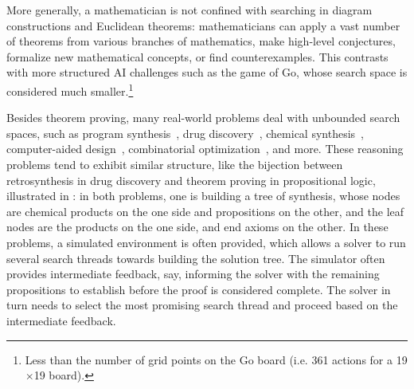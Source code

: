 More generally, a mathematician is not confined with searching in diagram constructions and Euclidean theorems: mathematicians can apply a vast number of theorems from various branches of mathematics, make high-level conjectures, formalize new mathematical concepts, or find counterexamples. This contrasts with more structured AI challenges such as the game of Go, whose search space is considered much smaller.\footnote{Less than the number of grid points on the Go board (i.e. 361 actions for a 19$\times$19 board).}

Besides theorem proving, many real-world problems deal with unbounded search spaces, such as program synthesis~\citep{DBLP:journals/ftpl/GulwaniPS17}, drug discovery~\citep{Drews2000DrugDA}, chemical synthesis~\citep{DBLP:journals/nature/SeglerPW18}, computer-aided design~\citep{computer_aided_design}, combinatorial optimization~\citep{DBLP:journals/eor/BengioLP21}, and more. These reasoning problems tend to exhibit similar structure, like the bijection between retrosynthesis in drug discovery and theorem proving in propositional logic, illustrated in : in both problems, one is building a tree of synthesis, whose nodes are chemical products on the one side and propositions on the other, and the leaf nodes are the products on the one side, and end axioms on the other. In these problems, a simulated environment is often provided, which allows a solver to run several search threads towards building the solution tree. The simulator often provides intermediate feedback, say, informing the solver with the remaining propositions to establish before the proof is considered complete. The solver in turn needs to select the most promising search thread and proceed based on the intermediate feedback.

